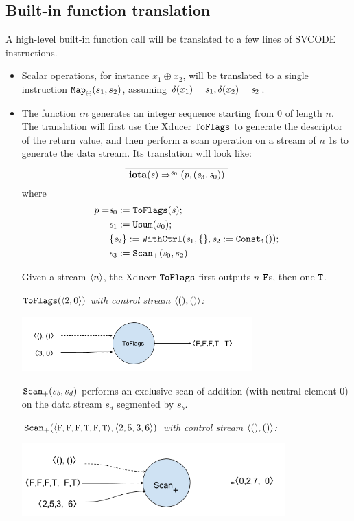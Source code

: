 \subsection{Built-in function translation}
A high-level built-in function call will be translated to a few lines of SVCODE instructions.

\begin{itemize}
	\item Scalar operations, for instance $x_1 \oplus x_2$, will be translated to a single instruction $\map{\oplus}(s_1,s_2)$, assuming $\del(x_1) = s_1, \del(x_2) = \s_2$.
	
	\item The function $\iota{n}$  generates an integer sequence starting from 0 of length $n$.  
	The translation will first use the Xducer $\toflag$ to generate the descriptor of the return value, and then perform a scan operation on a stream of $n$ 1s to generate the data stream.
	Its translation will look like: 
	$$	\PT{
		\Axiom{\Transf{\iotan}{\s}{\s_0}{}{\sfun{p} {(\s_3,\s_0)}}}
	}$$
	where 
	\begin{align*}
			p= & \sdef{\s_0}{\toflag(\s)} ; \\ 
			& \sdef{\s_1}{\usum(s_0)} ; \\
			& \withctrl{\s_1}{\sdef{\s_2}{\consta{1}()}}{\{\}}{\{\s_2\}}; \\
			& \sdef{\s_3}{\genscan_{+}(\s_0,s_2)}
		\end{align*}

Given a stream $\singl{n}$, the Xducer $\toflag$ first outputs $n$ $\F$s, then one $\T$.

\begin{example} \emph{$\toflagf{\<2,0\'>}$  with control stream $\<(),()\'>$:}\\
	\begin{center}
		\includegraphics[width=0.7\textwidth]{fig/toflagsxducer.png}
	\end{center}
\end{example}

$\genscan_{+}(s_b,s_d)$ performs an exclusive scan of addition (with neutral element 0) on the data stream $s_d$ segmented by $s_b$.
\begin{example} \emph{$\genscan_{+}(\<\F,\F,\F,\T,\F,\T\'>, \< 2,5,3,6 \'>)$  with control stream $\<(),()\'>$: }\\
	\begin{center}
		\includegraphics[width=0.8\textwidth]{fig/scanxducer.png}
	\end{center}
\end{example}




\end{itemize}
